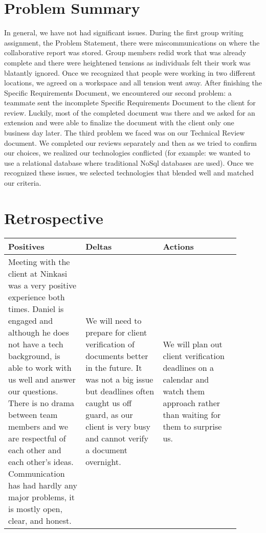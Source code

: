\documentclass[draftclsnofoot,onecolumn,letterpaper,10pt,compsoc]{IEEEtran}
\begin{document}
\section{Problem Summary}
In general, we have not had significant issues.
During the first group writing assignment, the Problem Statement, there were miscommunications on where the collaborative report was stored.
Group members redid work that was already complete and there were heightened tensions as individuals felt their work was blatantly ignored.
Once we recognized that people were working in two different locations, we agreed on a workspace and all tension went away.
After finishing the Specific Requirements Document, we encountered our second problem: a teammate sent the incomplete Specific Requirements Document to the client for review.
Luckily, most of the completed document was there and we asked for an extension and were able to finalize the document with the client only one business day later.
The third problem we faced was on our Technical Review document.
We completed our reviews separately and then as we tried to confirm our choices, we realized our technologies conflicted (for example: we wanted to use a relational database where traditional NoSql databases are used).
Once we recognized these issues, we selected technologies that blended well and matched our criteria.

\section{Retrospective}
\begin{center}
    \begin{tabular}{|p{0.3\linewidth}|p{0.3\linewidth}|p{0.3\linewidth}|}
        \hline
             Positives & Deltas & Actions \\
        \hline
            Meeting with the client at Ninkasi was a very positive experience both times.
						Daniel is engaged and although he does not have a tech background, is able to work with us well and answer our questions.
						There is no drama between team members and we are respectful of each other and each other’s ideas.
						Communication has had hardly any major problems, it is mostly open, clear, and honest.
            &
            We will need to prepare for client verification of documents better in the future.
						It was not a big issue but deadlines often caught us off guard, as our client is very busy and cannot verify a document overnight.
            &
            We will plan out client verification deadlines on a calendar and watch them approach rather than waiting for them to surprise us.
            \\
            \hline
    \end{tabular}
\end{center}
\end{document}
